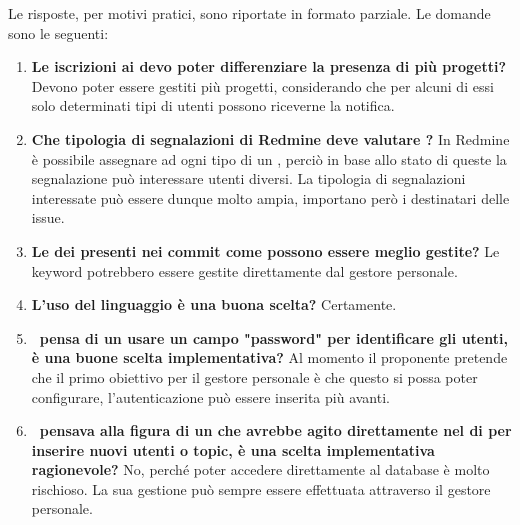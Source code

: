     	Le risposte, per motivi pratici, sono riportate in formato parziale. Le domande sono le seguenti:
    	\begin{enumerate}
    		\item \textbf{Le iscrizioni ai  devo poter differenziare la presenza di più progetti?} Devono poter essere gestiti più progetti, considerando che per alcuni di essi solo determinati tipi di utenti possono riceverne la notifica.
    		\item \textbf{Che tipologia di segnalazioni di Redmine deve valutare \progetto?} In Redmine è possibile assegnare ad ogni tipo di  un , perciò in base allo stato di queste la segnalazione può interessare utenti diversi. La tipologia di segnalazioni interessate può essere dunque molto ampia, importano però i destinatari delle issue.
    		\item \textbf{Le  dei presenti nei commit come possono essere meglio gestite?} Le keyword potrebbero essere gestite direttamente dal gestore personale.
    		\item \textbf{L'uso del linguaggio  è una buona scelta?} Certamente.
    		\item \textbf{\gruppo~pensa di un usare un campo "password" per identificare gli utenti, è una buone scelta implementativa?} Al momento il proponente pretende che il primo obiettivo per il gestore personale è che questo si possa poter configurare, l'autenticazione può essere inserita più avanti.
    		\item \textbf{\gruppo~pensava alla figura di un  che avrebbe agito direttamente nel  di  per inserire nuovi utenti o topic, è una scelta implementativa ragionevole?} No, perché poter accedere direttamente al database è molto rischioso. La sua gestione può sempre essere effettuata attraverso il gestore personale.
    	\end{enumerate}
